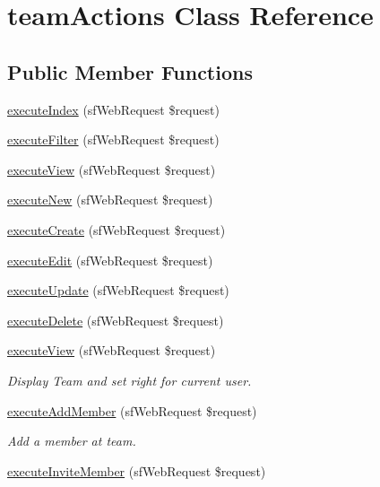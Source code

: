 \hypertarget{classteam_actions}{\section{team\-Actions Class Reference}
\label{classteam_actions}
}
\subsection*{Public Member Functions}
\begin{DoxyCompactItemize}
\item 
\hyperlink{classteam_actions_a948cc911eb1d9f77990be54af3b2080f}{execute\-Index} (sf\-Web\-Request \$request)
\item 
\hyperlink{classteam_actions_a3db5e68bcd095e22f3ae08c7c19497d5}{execute\-Filter} (sf\-Web\-Request \$request)
\item 
\hyperlink{classteam_actions_ad61d212fa3f7e8cb4190700a8a670606}{execute\-View} (sf\-Web\-Request \$request)
\item 
\hyperlink{classteam_actions_a0ffbea56560c6c633dae68ec22aff21c}{execute\-New} (sf\-Web\-Request \$request)
\item 
\hyperlink{classteam_actions_a75837617743fb64dca82d8133b2c662a}{execute\-Create} (sf\-Web\-Request \$request)
\item 
\hyperlink{classteam_actions_af4d8fedd4b28f3398826a1bb8fa54394}{execute\-Edit} (sf\-Web\-Request \$request)
\item 
\hyperlink{classteam_actions_af7b4f51862add3c2ebb54efc136a0840}{execute\-Update} (sf\-Web\-Request \$request)
\item 
\hyperlink{classteam_actions_a52b5b11b11a0070dd2662257520c045a}{execute\-Delete} (sf\-Web\-Request \$request)
\item 
\hyperlink{classteam_actions_ad61d212fa3f7e8cb4190700a8a670606}{execute\-View} (sf\-Web\-Request \$request)
\begin{DoxyCompactList}\small\item\em Display Team and set right for current user. \end{DoxyCompactList}\item 
\hyperlink{classteam_actions_a72b57eeb9e51594d7a288e62d8990f63}{execute\-Add\-Member} (sf\-Web\-Request \$request)
\begin{DoxyCompactList}\small\item\em Add a member at team. \end{DoxyCompactList}\item 
\hyperlink{classteam_actions_a80d4edb05c65ccbd9b507bdccde6c5a1}{execute\-Invite\-Member} (sf\-Web\-Request \$request)

\end{DoxyCompactItemize}
